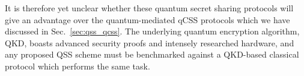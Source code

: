 It is therefore yet unclear whether these quantum secret sharing protocols will give an advantage over the quantum-mediated qCSS protocols which we have discussed in Sec.~\ref{sec:qss_qcss}. The underlying quantum encryption algorithm, QKD, boasts advanced security proofs and intensely researched hardware, and any proposed QSS scheme must be benchmarked against a QKD-based classical protocol which performs the same task.